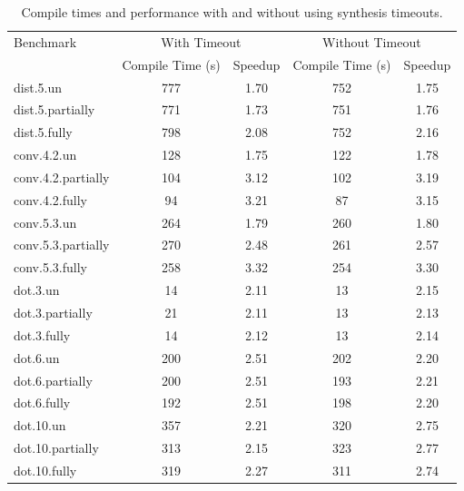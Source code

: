 \begin{table}
    \caption{Compile times and performance with and without using synthesis timeouts.}\label{tab:ilp-ablation}
    \centering
    \begin{tabular}{lcccc}
        \toprule
        Benchmark & \multicolumn{2}{c}{With Timeout} & \multicolumn{2}{c}{Without Timeout}\\\cline{2-5}

         & Compile Time (s) & Speedup & Compile Time (s) & Speedup \\\midrule
        dist.5.un & 777 & 1.70 & 752 & 1.75 \\
        dist.5.partially & 771 & 1.73 & 751 & 1.76 \\
        dist.5.fully & 798 & 2.08 & 752 & 2.16 \\
        \midrule
        conv.4.2.un & 128 & 1.75 & 122 & 1.78 \\
        conv.4.2.partially & 104 & 3.12 & 102 & 3.19 \\
        conv.4.2.fully & 94 & 3.21 & 87 & 3.15 \\
        \midrule
        conv.5.3.un & 264 & 1.79 & 260 & 1.80 \\
        conv.5.3.partially & 270 & 2.48 & 261 & 2.57 \\
        conv.5.3.fully & 258 & 3.32 & 254 & 3.30 \\
        \midrule
        dot.3.un & 14 & 2.11 & 13 & 2.15 \\
        dot.3.partially & 21 & 2.11 & 13 & 2.13 \\
        dot.3.fully & 14 & 2.12 & 13 & 2.14 \\
        \midrule
        dot.6.un & 200 & 2.51 & 202 & 2.20 \\
        dot.6.partially & 200 & 2.51 & 193 & 2.21 \\
        dot.6.fully & 192 & 2.51 & 198 & 2.20 \\
        \midrule
        dot.10.un & 357 & 2.21 & 320 & 2.75 \\
        dot.10.partially & 313 & 2.15 & 323 & 2.77 \\
        dot.10.fully & 319 & 2.27 & 311 & 2.74 \\
        \bottomrule
    \end{tabular}
\end{table}



